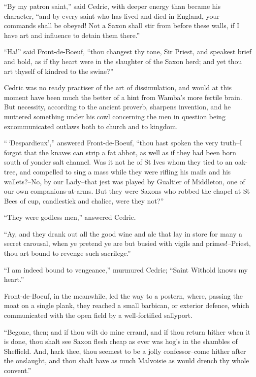 ``By my patron saint,'' said Cedric, with deeper energy than became his
character, ``and by every saint who has lived and died in England, your
commands shall be obeyed! Not a Saxon shall stir from before these
walls, if I have art and influence to detain them there.''

``Ha!'' said Front-de-Boeuf, ``thou changest thy tone, Sir Priest, and
speakest brief and bold, as if thy heart were in the slaughter of the
Saxon herd; and yet thou art thyself of kindred to the swine?''

Cedric was no ready practiser of the art of dissimulation, and would at
this moment have been much the better of a hint from Wamba's more
fertile brain. But necessity, according to the ancient proverb, sharpens
invention, and he muttered something under his cowl concerning the men
in question being excommunicated outlaws both to church and to kingdom.

``\,`Despardieux','' answered Front-de-Boeuf, ``thou hast spoken the
very truth--I forgot that the knaves can strip a fat abbot, as well as
if they had been born south of yonder salt channel. Was it not he of St
Ives whom they tied to an oak-tree, and compelled to sing a mass while
they were rifling his mails and his wallets?--No, by our Lady--that jest
was played by Gualtier of Middleton, one of our own companions-at-arms.
But they were Saxons who robbed the chapel at St Bees of cup,
candlestick and chalice, were they not?''

``They were godless men,'' answered Cedric.

``Ay, and they drank out all the good wine and ale that lay in store for
many a secret carousal, when ye pretend ye are but busied with vigils
and primes!--Priest, thou art bound to revenge such sacrilege.''

``I am indeed bound to vengeance,'' murmured Cedric; ``Saint Withold
knows my heart.''

Front-de-Boeuf, in the meanwhile, led the way to a postern, where,
passing the moat on a single plank, they reached a small barbican, or
exterior defence, which communicated with the open field by a
well-fortified sallyport.

``Begone, then; and if thou wilt do mine errand, and if thou return
hither when it is done, thou shalt see Saxon flesh cheap as ever was
hog's in the shambles of Sheffield. And, hark thee, thou seemest to be a
jolly confessor--come hither after the onslaught, and thou shalt have as
much Malvoisie as would drench thy whole convent.''

